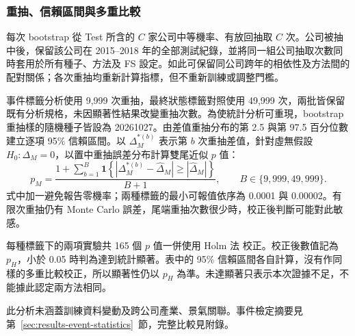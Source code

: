 \subsubsection{重抽、信賴區間與多重比較}

每次 bootstrap 從 Test 所含的 \(C\) 家公司中等機率、有放回抽取 \(C\) 次。公司被抽中後，保留該公司在 2015--2018 年的全部測試紀錄，並將同一組公司抽取次數同時套用於所有種子、方法及 FS 設定。如此可保留同公司跨年的相依性及方法間的配對關係；各次重抽均重新計算指標，但不重新訓練或調整門檻。

事件標籤分析使用 9,999 次重抽，最終狀態標籤對照使用 49,999 次，兩批皆保留既有分析規格，未因顯著性結果改變重抽次數。為使統計分析可重現，bootstrap 重抽樣的隨機種子皆設為 20261027。由差值重抽分布的第 2.5 與第 97.5 百分位數建立逐項 95\% 信賴區間。以 \(\Delta_M^{*(b)}\) 表示第 \(b\) 次重抽差值，針對虛無假設 \(H_0:\Delta_M=0\)，以置中重抽誤差分布計算雙尾近似 \(p\) 值：
\begin{equation}\label{eq:stats-bootstrap-p}
p_M=\frac{1+\sum_{b=1}^{B}\mathbf{1}\!\left\{
\left|\Delta_M^{*(b)}-\widehat{\Delta}_M\right|\geq
\left|\widehat{\Delta}_M\right|\right\}}{B+1},
\qquad B\in\{9{,}999,49{,}999\}.
\end{equation}
式中加一避免報告零機率；兩種標籤的最小可報值依序為 0.0001 與 0.00002。有限次重抽仍有 Monte Carlo 誤差，尾端重抽次數很少時，校正後判斷可能對此敏感。

每種標籤下的兩項實驗共 165 個 \(p\) 值一併使用 Holm 法\autocite{holm1979multiple} 校正。校正後數值記為 \(p_H\)，小於 0.05 時判為達到統計顯著。表中的 95\% 信賴區間各自計算，沒有作同樣的多重比較校正，所以顯著性仍以 \(p_H\) 為準。未達顯著只表示本次證據不足，不能據此認定兩方法相同。

此分析未涵蓋訓練資料變動及跨公司產業、景氣關聯。事件檢定摘要見第~\ref{sec:results-event-statistics}~節，完整比較見附錄。
\endgroup
